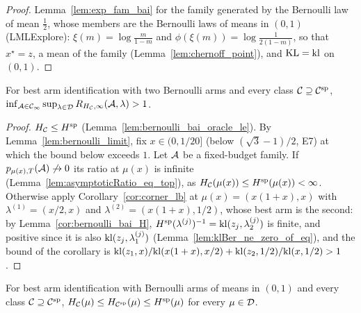\begin{proof}
  \leanok
  Lemma~\ref{lem:exp_fam_bai} for the family generated by the Bernoulli law of mean $\frac12$,
  whose members are the Bernoulli laws of means in $(0, 1)$ (LMLExplore): $\xi(m) = \log \frac{m}{1
  - m}$ and $\phi(\xi(m)) = \log \frac{1}{2 (1 - m)}$, so that $x^{\star} = z$, a mean of the family
  (Lemma~\ref{lem:chernoff_point}), and $\mathrm{KL} = \mathrm{kl}$ on $(0, 1)$.
\end{proof}

\begin{theorem}[{\cite[Theorem 10]{D23}}]
  \label{thm:bernoulli_bai_no_complexity}
  \leanok
  For best arm identification with two Bernoulli arms and every class $\mathcal{C} \supseteq \mathcal{C}^{\mathrm{sp}}$,
  $\inf_{\mathcal{A} \in \mathcal{C}_{\infty}} \sup_{\lambda \in \mathcal{D}} R_{H_{\mathcal{C}}, \infty}(\mathcal{A}, \lambda) > 1$.
\end{theorem}

\begin{proof}
  \leanok
  $H_{\mathcal{C}} \le H^{\mathrm{sp}}$ (Lemma~\ref{lem:bernoulli_bai_oracle_le}). By Lemma~\ref{lem:bernoulli_limit},
  fix $x \in (0, 1/20]$ (below $(\sqrt 3 - 1)/2$, E7) at which the bound below exceeds $1$. Let
  $\mathcal{A}$ be a fixed-budget family. If $p_{\mu(x),T}(\mathcal{A}) \not\to 0$ its ratio at $\mu(x)$ is
  infinite (Lemma~\ref{lem:asymptoticRatio_eq_top}), as $H_{\mathcal{C}}(\mu(x)) \le H^{\mathrm{sp}}(\mu(x)) <
  \infty$. Otherwise apply Corollary~\ref{cor:corner_lb} at $\mu(x) = (x(1 + x), x)$ with
  $\lambda^{(1)} = (x/2, x)$ and $\lambda^{(2)} = (x(1 + x), 1/2)$, whose best arm is the second:
  by Lemma~\ref{cor:bernoulli_bai_H}, $H^{\mathrm{sp}}(\lambda^{(j)})^{-1} = \mathrm{kl}(z_j, \lambda^{(j)}_2)$ is finite,
  and positive since it is also $\mathrm{kl}(z_j, \lambda^{(j)}_1)$ (Lemma~\ref{lem:klBer_ne_zero_of_eq}),
  and the bound of the corollary is
  $\mathrm{kl}(z_1, x) / \mathrm{kl}(x(1 + x), x/2) + \mathrm{kl}(z_2, 1/2) / \mathrm{kl}(x, 1/2) > 1$.
\end{proof}

\begin{lemma}
  \label{lem:bernoulli_bai_oracle_le}
  \leanok
  For best arm identification with Bernoulli arms of means in $(0, 1)$ and every class $\mathcal{C}
  \supseteq \mathcal{C}^{\mathrm{sp}}$, $H_{\mathcal{C}}(\mu) \le H_{\mathcal{C}^{\mathrm{sp}}}(\mu) \le H^{\mathrm{sp}}(\mu)$ for every $\mu \in \mathcal{D}$.
\end{lemma}

